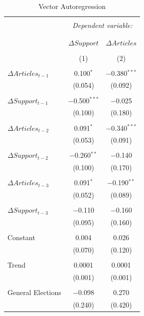 \documentclass[12pt,article]{article}
\begin{document}
\begin{table}[!htbp] \centering 
  \caption{Vector Autoregression} 
  \label{} 
\begin{tabular}{@{\extracolsep{5pt}}lcc} 
\\[-1.8ex]\hline 
\hline \\[-1.8ex] 
 & \multicolumn{2}{c}{\textit{Dependent variable:}} \\ 
\cline{2-3} 
\\[-1.8ex] & \multicolumn{2}{c}{} \\ 
 & $\Delta Support$ & $\Delta Articles$ \\ 
\\[-1.8ex] & (1) & (2)\\ 
\hline \\[-1.8ex] 
 $\Delta Articles_{t-1}$ & 0.100$^{*}$ & $-$0.380$^{***}$ \\ 
  & (0.054) & (0.092) \\ 
  & & \\ 
 $\Delta Support_{t-1}$ & $-$0.500$^{***}$ & $-$0.025 \\ 
  & (0.100) & (0.180) \\ 
  & & \\ 
 $\Delta Articles_{t-2}$ & 0.091$^{*}$ & $-$0.340$^{***}$ \\ 
  & (0.053) & (0.091) \\ 
  & & \\ 
 $\Delta Support_{t-2}$ & $-$0.260$^{**}$ & $-$0.140 \\ 
  & (0.100) & (0.170) \\ 
  & & \\ 
 $\Delta Articles_{t-3}$ & 0.091$^{*}$ & $-$0.190$^{**}$ \\ 
  & (0.052) & (0.089) \\ 
  & & \\ 
 $\Delta Support_{t-3}$ & $-$0.110 & $-$0.160 \\ 
  & (0.095) & (0.160) \\ 
  & & \\ 
 Constant & 0.004 & 0.026 \\ 
  & (0.070) & (0.120) \\ 
  & & \\ 
 Trend & 0.0001 & 0.0001 \\ 
  & (0.001) & (0.001) \\ 
  & & \\ 
 General Elections & $-$0.098 & 0.270 \\ 
  & (0.240) & (0.420) \\ 

\end{tabular}
\end{table}
\end{document}
